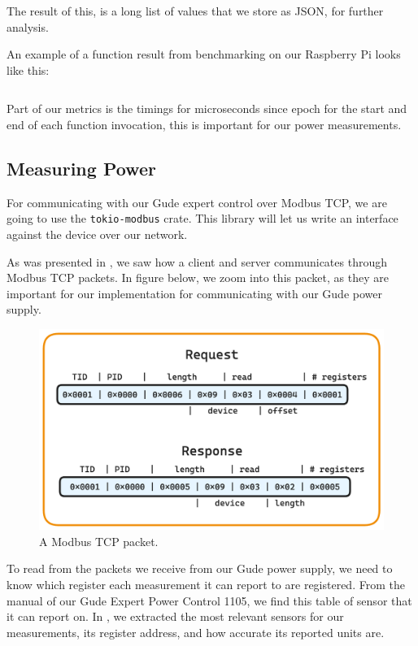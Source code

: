 \documentclass[
  table]{report}
\begin{document}
The result of this, is a long list of values that we store as JSON, for
further analysis.

An example of a function result from benchmarking on our Raspberry Pi
looks like this:

\inputminted{json}{assets/code/result_example.json}

Part of our metrics is the timings for microseconds since epoch for the
start and end of each function invocation, this is important for our
power measurements.

\subsection{Measuring Power}
\label{sect:measure_power}

For communicating with our Gude expert control over Modbus TCP, we are
going to use the \texttt{tokio-modbus} crate. This library will let us
write an interface against the device over our network.

As was presented in , we saw how a client and
server communicates through Modbus TCP packets. In figure
 below, we zoom into this packet, as they
are important for our implementation for communicating with our Gude
power supply.

\begin{figure}[H]
\centering
  \includegraphics[width=0.7\columnwidth]{assets/6-modbus_packet.png}
  \caption{A Modbus TCP packet.}
  \label{fig:modbus_tcp_packet}
\end{figure}

To read from the packets we receive from our Gude power supply, we need
to know which register each measurement it can report to are registered.
From the manual of our Gude Expert Power Control 1105, we find this
table of sensor that it can report on. In , we
extracted the most relevant sensors for our measurements, its register
address, and how accurate its reported units are.
\end{document}
